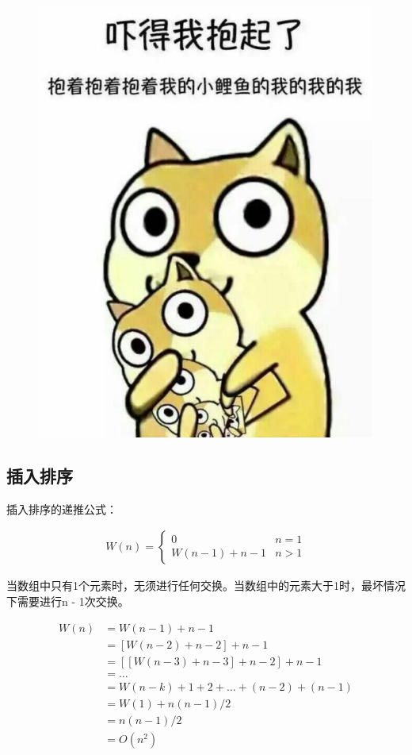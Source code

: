 \begin{figure}[H]
    \centering
    \includegraphics[]{img/C11/11-3/2.png}
\end{figure}

\subsection{插入排序}

插入排序的递推公式：

\vspace{-0.5cm}

\begin{align*}
    W(n) = \begin{cases}
        0                & n = 1 \\
        W(n - 1) + n - 1 & n > 1
    \end{cases}
\end{align*}

当数组中只有1个元素时，无须进行任何交换。当数组中的元素大于1时，最坏情况下需要进行n - 1次交换。

\vspace{-0.5cm}

\begin{align*}
    W(n) & = W(n - 1) + n - 1                             \\
         & = [W(n - 2) + n - 2] + n - 1                   \\
         & = [[W(n - 3) + n - 3] + n - 2] + n - 1         \\
         & = \dots                                        \\
         & = W(n - k) + 1 + 2 + \dots + (n - 2) + (n - 1) \\
         & = W(1) + n(n - 1) / 2                          \\
         & = n(n - 1) / 2                                 \\
         & = O(n^2)
\end{align*}

